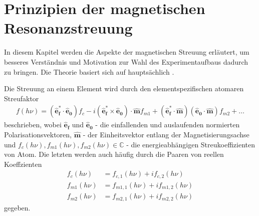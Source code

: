 \chapter{Prinzipien der magnetischen Resonanzstreuung}
\label{text:streuung}
In diesem Kapitel werden die Aspekte der magnetischen Streuung erläutert, um besseres Verständnis und Motivation zur Wahl des Experimentaufbaus dadurch zu bringen. Die Theorie basiert sich auf hauptsächlich \cite{kortright_resonant_2013}. 


\noindent
Die Streuung an einem Element wird durch den elementspezifischen atomaren Streufaktor
\begin{align}
f(h\nu) = (\mathbf{\hat{e}_f^*} \cdot \mathbf{\hat{e}_0})f_c - i(\mathbf{\hat{e}_f^*} \times \mathbf{\hat{e}_0})\cdot\mathbf{\hat{m}}f_{m1}+(\mathbf{\hat{e}_f^*} \cdot \mathbf{\hat{m}})(\mathbf{\hat{e}_0}\cdot\mathbf{\hat{m}})f_{m2} + \dots
\label{eq:atomfaktoren}
\end{align}
beschrieben, wobei $\mathbf{\hat{e}_f}$ und $\mathbf{\hat{e}_0}$ - die einfallenden und auslaufenden normierten Polarisationsvektoren, $\mathbf{\hat{m}}$ - der Einheitsvektor entlang der Magnetisierungsachse und $f_c(h\nu), f_{m1}(h\nu), f_{m2}(h\nu) \in \mathbb{C}$ - die energieabhängigen Streukoeffizienten von Atom. Die letzten werden auch häufig durch die Paaren von reellen Koeffzienten
\begin{equation}
    \begin{split}
    f_c(h\nu) &= f_{c,1}(h\nu) + if_{c,2}(h\nu)\\
    f_{m1}(h\nu) &= f_{m1,1}(h\nu) + if_{m1,2}(h\nu)\\
    f_{m2}(h\nu) &= f_{m2,1}(h\nu) + if_{m2,2}(h\nu)
\end{split}
\label{eq:komplex_paar}
\end{equation}
gegeben.


